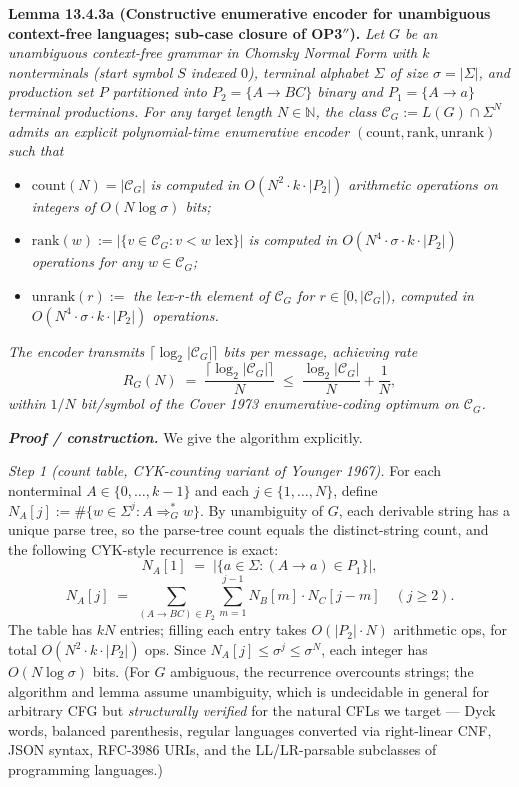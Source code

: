 \documentclass[
]{article}
\begin{document}
\textbf{Lemma 13.4.3a (Constructive enumerative encoder for
unambiguous context-free languages; sub-case closure of OP3$''$).}
\emph{Let $G$ be an unambiguous context-free grammar in Chomsky Normal
Form with $k$ nonterminals (start symbol $S$ indexed $0$), terminal
alphabet $\Sigma$ of size $\sigma = |\Sigma|$, and production set $P$
partitioned into $P_2 = \{A \to BC\}$ binary and $P_1 = \{A \to a\}$
terminal productions. For any target length $N \in \mathbb{N}$, the
class $\mathcal{C}_G := L(G) \cap \Sigma^N$ admits an explicit
polynomial-time enumerative encoder $(\mathrm{count}, \mathrm{rank},
\mathrm{unrank})$ such that}
\begin{itemize}
\item $\mathrm{count}(N) = |\mathcal{C}_G|$ \emph{is computed in
$O(N^2 \cdot k \cdot |P_2|)$ arithmetic operations on integers of
$O(N \log \sigma)$ bits;}
\item $\mathrm{rank}(w) := |\{v \in \mathcal{C}_G : v < w \text{ lex}\}|$
\emph{is computed in $O(N^4 \cdot \sigma \cdot k \cdot |P_2|)$
operations for any $w \in \mathcal{C}_G$;}
\item $\mathrm{unrank}(r) := $ \emph{the lex-$r$-th element of
$\mathcal{C}_G$ for $r \in [0, |\mathcal{C}_G|)$, computed in
$O(N^4 \cdot \sigma \cdot k \cdot |P_2|)$ operations.}
\end{itemize}
\emph{The encoder transmits $\lceil \log_2 |\mathcal{C}_G| \rceil$ bits
per message, achieving rate}
\[
R_G(N) \;=\; \frac{\lceil \log_2 |\mathcal{C}_G| \rceil}{N}
\;\leq\; \frac{\log_2 |\mathcal{C}_G|}{N} + \frac{1}{N},
\]
\emph{within $1/N$ bit/symbol of the Cover 1973 enumerative-coding
optimum on $\mathcal{C}_G$.}

\emph{\textbf{Proof / construction.}} We give the algorithm explicitly.

\emph{Step 1 (count table, CYK-counting variant of Younger 1967).} For
each nonterminal $A \in \{0, \ldots, k-1\}$ and each $j \in \{1, \ldots,
N\}$, define $N_A[j] := \#\{w \in \Sigma^j : A \Rightarrow_G^\ast w\}$.
By unambiguity of $G$, each derivable string has a unique parse tree,
so the parse-tree count equals the distinct-string count, and the
following CYK-style recurrence is exact:
\[
N_A[1] \;=\; |\{a \in \Sigma : (A \to a) \in P_1\}|,
\]
\[
N_A[j] \;=\; \sum_{(A \to BC) \in P_2} \sum_{m=1}^{j-1} N_B[m] \cdot N_C[j-m]
\quad (j \geq 2).
\]
The table has $kN$ entries; filling each entry takes $O(|P_2| \cdot N)$
arithmetic ops, for total $O(N^2 \cdot k \cdot |P_2|)$ ops. Since
$N_A[j] \leq \sigma^j \leq \sigma^N$, each integer has
$O(N \log \sigma)$ bits. (For $G$ ambiguous, the recurrence overcounts
strings; the algorithm and lemma assume unambiguity, which is
undecidable in general for arbitrary CFG but \emph{structurally
verified} for the natural CFLs we target --- Dyck words, balanced
parenthesis, regular languages converted via right-linear CNF, JSON
syntax, RFC-3986 URIs, and the LL/LR-parsable subclasses of
programming languages.)
\end{document}
